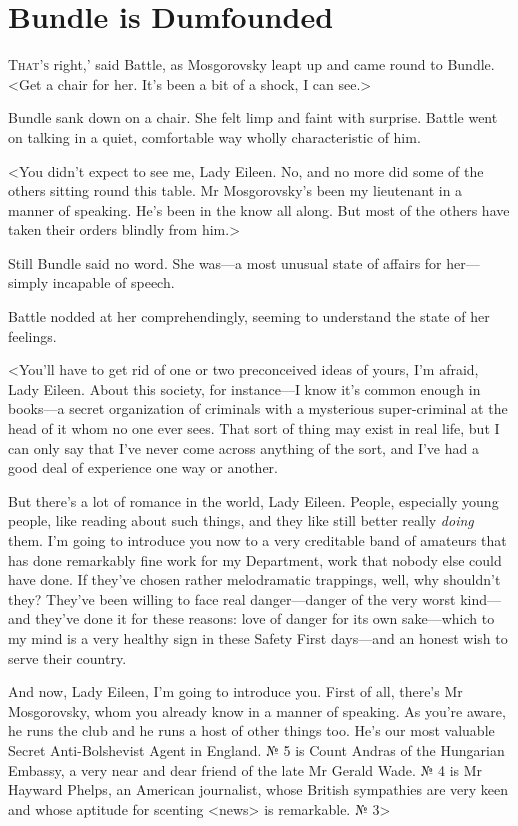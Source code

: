 \chapter{Bundle is Dumfounded}

\lettrine[ante=`]{T}{hat's} right,' said Battle, as Mosgorovsky leapt up and came round to Bundle. <Get a chair for her. It's been a bit of a shock, I can see.>

\zz
Bundle sank down on a chair. She felt limp and faint with surprise. Battle went on talking in a quiet, comfortable way wholly characteristic of him.

<You didn't expect to see me, Lady Eileen. No, and no more did some of the others sitting round this table. Mr Mosgorovsky's been my lieutenant in a manner of speaking. He's been in the know all along. But most of the others have taken their orders blindly from him.>

Still Bundle said no word. She was—a most unusual state of affairs for her—simply incapable of speech.

Battle nodded at her comprehendingly, seeming to understand the state of her feelings.

<You'll have to get rid of one or two preconceived ideas of yours, I'm afraid, Lady Eileen. About this society, for instance—I know it's common enough in books—a secret organization of criminals with a mysterious super-criminal at the head of it whom no one ever sees. That sort of thing may exist in real life, but I can only say that I've never come across anything of the sort, and I've had a good deal of experience one way or another.

But there's a lot of romance in the world, Lady Eileen. People, especially young people, like reading about such things, and they like still better really \emph{doing} them. I'm going to introduce you now to a very creditable band of amateurs that has done remarkably fine work for my Department, work that nobody else could have done. If they've chosen rather melodramatic trappings, well, why shouldn't they? They've been willing to face real danger—danger of the very worst kind—and they've done it for these reasons: love of danger for its own sake—which to my mind is a very healthy sign in these Safety First days—and an honest wish to serve their country.

And now, Lady Eileen, I'm going to introduce you. First of all, there's Mr Mosgorovsky, whom you already know in a manner of speaking. As you're aware, he runs the club and he runs a host of other things too. He's our most valuable Secret Anti-Bolshevist Agent in England. № 5 is Count Andras of the Hungarian Embassy, a very near and dear friend of the late Mr Gerald Wade. № 4 is Mr Hayward Phelps, an American journalist, whose British sympathies are very keen and whose aptitude for scenting <news> is remarkable. № 3\longdash>

